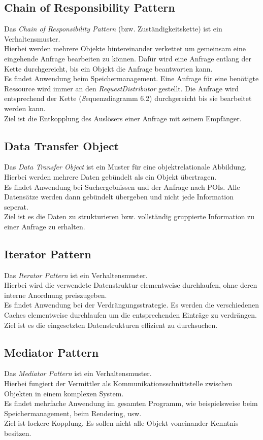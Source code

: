 \documentclass[10pt]{scrreprt}
\newcommand{\textref}[1]{\mbox{\raisebox{0.1ex}{\small$\rightarrow$ }\textit{#1}}}
\begin{document}
\subsection{Chain of Responsibility Pattern}
Das \textit{Chain of Responsibility Pattern} (bzw. Zuständigkeitskette) ist ein Verhaltensmuster. \\
Hierbei werden mehrere Objekte hintereinander verkettet um gemeinsam eine eingehende Anfrage bearbeiten zu können. Dafür wird eine Anfrage entlang der Kette durchgereicht, bis ein Objekt die Anfrage beantworten kann. \\ Es findet Anwendung beim Speichermanagement. Eine Anfrage für eine benötigte Ressource wird immer an den \textit{RequestDistributor} gestellt. Die Anfrage wird entsprechend der Kette (\textref Sequenzdiagramm 6.2) durchgereicht bis sie bearbeitet werden kann. \\ Ziel ist die Entkopplung des Auslösers einer Anfrage mit seinem Empfänger.

\subsection{Data Transfer Object}
Das \textit{Data Transfer Object} ist ein Muster für eine objektrelationale Abbildung. \\
Hierbei werden mehrere Daten gebündelt als ein Objekt übertragen. \\ Es findet Anwendung bei Suchergebnissen und der Anfrage nach POIs. Alle Datensätze werden dann gebündelt übergeben und nicht jede Information seperat. \\ Ziel ist es die Daten zu strukturieren bzw. vollständig gruppierte Information zu einer Anfrage zu erhalten.

\subsection{Iterator Pattern}
Das \textit{Iterator Pattern} ist ein Verhaltensmuster.\\ Hierbei wird die verwendete Datenstruktur elementweise durchlaufen, ohne deren interne Anordnung preiszugeben.\\ Es findet Anwendung bei der Verdrängungsstrategie. Es werden die verschiedenen Caches elementweise durchlaufen um die entsprechenden Einträge zu verdrängen.\\
Ziel ist es die eingesetzten Datenstrukturen effizient zu durchsuchen.

\subsection{Mediator Pattern}
Das \textit{Mediator Pattern} ist ein Verhaltensmuster. \\ Hierbei fungiert der Vermittler als Kommunikationsschnittstelle zwischen Objekten in einem komplexen System.\\ Es findet mehrfache Anwendung im gesamten Programm, wie beispielsweise beim Speichermanagement, beim Rendering, usw. \\ Ziel ist lockere Kopplung. Es sollen nicht alle Objekt voneinander Kenntnis besitzen.
\end{document}
